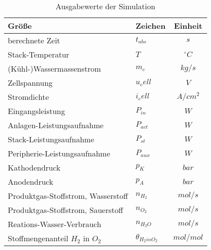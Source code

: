 \documentclass[onecolumn,10pt,titlepage]{article}
\begin{document}
\begin{table}[H]
	\caption{Ausgabewerte der Simulation}
	\begin{tabular}{llc}
		Größe&Zeichen&Einheit\\
		\hline
		\hline
		berechnete Zeit&$t_{abs}$ 	&$s$\\
		Stack-Temperatur&$T$ 		& $^\circ C$\\
		(Kühl-)Wassermassenstrom&$m_c$		&$kg/s$\\
		Zellspannung&$u_cell$	&$V$\\
		Stromdichte&$i_cell$	&$A/cm^2$\\
		Eingangsleistung&$P_{in}$	&$W$\\
		Anlagen-Leistungsaufnahme&$P_{act}$	&$W$\\
		Stack-Leistungsaufnahme&$P_{st}$	&$W$\\
		Peripherie-Leistungsaufnahme&$P_{aux}$	&$W$\\
		Kathodendruck&$p_K$		&$bar$\\
		Anodendruck&$p_A$		&$bar$\\
		Produktgas-Stoffstrom, Wasserstoff&$n_{H_2}$	&$mol/s$\\
		Produktgas-Stoffstrom, Sauerstoff & $n_{O_2}$		&$mol/s$\\
		Reations-Wasser-Verbrauch&$n_{H_{2}O}$&$mol/s$\\
		Stoffmengenanteil $H_2$ in $O_2$&$\theta_{H_2inO_2}$&$mol/mol$\\

	\end{tabular}
	\label{tab:mod_calc_Ausgabewerte}
\end{table}
\end{document}
